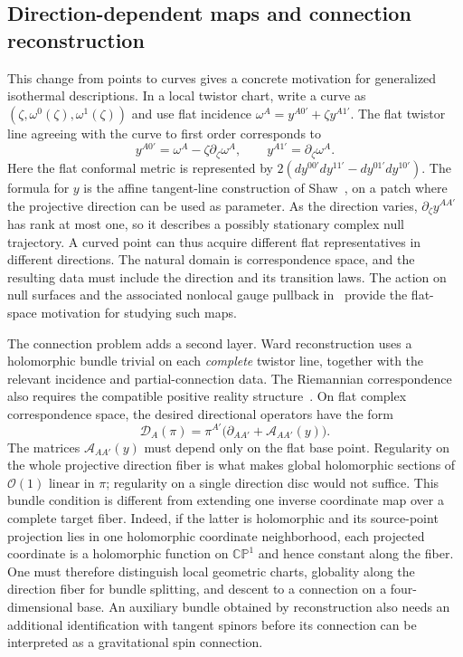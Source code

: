 \documentclass[11pt]{article}
\numberwithin{equation}{section}
\theoremstyle{definition}
\theoremstyle{remark}
\newcommand{\CP}{\mathbb{CP}}
\begin{document}
\subsection{Direction-dependent maps and connection reconstruction}

This change from points to curves gives a concrete motivation for generalized
isothermal descriptions. In a local twistor chart, write a curve as
$(\zeta,\omega^0(\zeta),\omega^1(\zeta))$ and use flat incidence
$\omega^A=y^{A0'}+\zeta y^{A1'}$. The flat twistor line agreeing with
the curve to first order corresponds to
\[
 y^{A0'}=\omega^A-\zeta\partial_\zeta\omega^A,\qquad
 y^{A1'}=\partial_\zeta\omega^A.
\]
Here the flat conformal metric is represented by
$2(dy^{00'}dy^{11'}-dy^{01'}dy^{10'})$. The formula for $y$ is the affine
tangent-line construction of Shaw~\cite{Shaw1986}, on a patch where the
projective direction can be used as parameter. As the direction varies,
$\partial_\zeta y^{AA'}$ has rank at most one, so it describes a possibly
stationary complex null trajectory. A curved point can thus acquire
different flat representatives in different directions. The natural domain
is correspondence space, and the resulting data must include the direction
and its transition laws. The action on null surfaces and the associated
nonlocal gauge pullback in~\cite{Baker2023} provide the flat-space
motivation for studying such maps.

The connection problem adds a second layer. Ward reconstruction uses a
holomorphic bundle trivial on each \emph{complete} twistor line, together
with the relevant incidence and partial-connection data. The Riemannian
correspondence also requires the compatible positive
reality structure~\cite{AHS1978}. On flat complex correspondence space,
the desired directional operators have the form
\[
 \mathcal D_A(\pi)=\pi^{A'}
       \bigl(\partial_{AA'}+\mathcal A_{AA'}(y)\bigr).
\]
The matrices $\mathcal A_{AA'}(y)$ must depend only on the flat base point.
Regularity on the whole projective direction fiber is what makes global
holomorphic sections of $\mathcal O(1)$ linear in $\pi$; regularity on a
single direction disc would not suffice. This bundle condition is different
from extending one inverse coordinate map over a complete target fiber.
Indeed, if the latter is holomorphic and its source-point projection lies
in one holomorphic coordinate neighborhood, each projected coordinate is
a holomorphic function on $\CP^1$ and hence constant along the fiber.
One must therefore distinguish local geometric charts, globality along the
direction fiber for bundle splitting, and descent to a connection on a
four-dimensional base. An auxiliary bundle obtained by reconstruction
also needs an additional identification with tangent spinors before its
connection can be interpreted as a gravitational spin connection.
\end{document}
